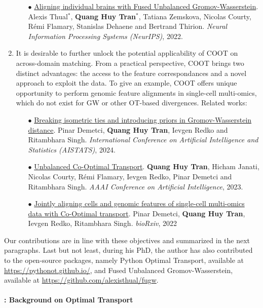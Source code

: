 \begin{enumerate}
\begin{itemize}
        \item[$\bullet$] \ul{Aligning individual brains with Fused Unbalanced Gromov-Wasserstein}.
         Alexis Thual$^*$, \textbf{Quang Huy Tran$^*$}, Tatiana Zemskova, Nicolas Courty,
         Rémi Flamary, Stanislas Dehaene and  Bertrand Thirion.
         \textit{Neural Information Processing Systems (NeurIPS)}, 2022.
    \end{itemize}

    \item It is desirable to further unlock the potential applicability of COOT
    on across-domain matching. From a practical perspective, COOT brings two distinct advantages:
    the access to the feature correspondances and a novel approach to exploit the data.
    To give an example, COOT offers unique opportunity to perform genomic feature alignments
    in single-cell multi-omics, which do not exist for GW or other OT-based divergences. Related works:
    \begin{itemize}
        \item[$\bullet$] \ul{Breaking isometric ties and introducing priors in Gromov-Wasserstein distance}.
        Pinar Demetci, \textbf{Quang Huy Tran}, Ievgen Redko and Ritambhara Singh.
        \textit{International Conference on Artificial Intelligence and Statistics (AISTATS)}, 2024.

        \item[$\bullet$] \ul{Unbalanced Co-Optimal Transport}. \textbf{Quang Huy Tran}, Hicham Janati,
        Nicolas Courty, Rémi Flamary, Ievgen Redko, Pinar Demetci and Ritambhara Singh.
        \textit{AAAI Conference on Artificial Intelligence}, 2023.

        \item[$\bullet$] \ul{Jointly aligning cells and genomic features of single-cell multi-omics data with Co-Optimal transport}.
        Pinar Demetci, \textbf{Quang Huy Tran}, Ievgen Redko, Ritambhara Singh. \textit{bioRxiv}, 2022
    \end{itemize}
\end{enumerate}
Our contributions are in line with these objectives and summarized in the next paragraphs.
Last but not least, during his PhD, the author has also contributed to the open-source packages,
namely Python Optimal Transport, available at \url{https://pythonot.github.io/}, and
Fused Unbalanced Gromov-Wasserstein, available at \url{https://github.com/alexisthual/fugw}.

\paragraph{ : Background on Optimal Transport}

